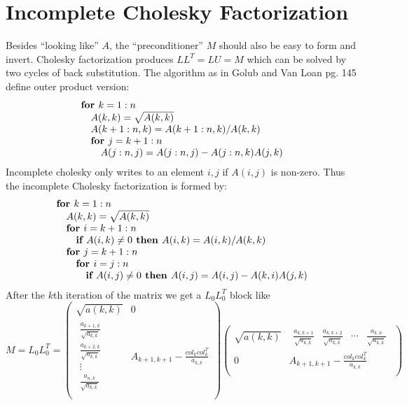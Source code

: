 \documentclass{article}
\newcommand{\pkeyword}[1]{\textbf{#1 }}
\newcommand{\pif}{\pkeyword{if}}
\newcommand{\pthen}{\pkeyword{ then}}
\newcommand{\pindent}{\textrm{\quad}}
\newcommand{\pfor}{\pkeyword{for}}
\begin{document}
\section{Incomplete Cholesky Factorization}
Besides ``looking like'' $A$, the ``preconditioner'' $M$ should also be easy to form and invert.  Cholesky factorization produces $LL^T=LU=M$ which
can be solved by two cycles of back substitution. The algorithm as in Golub and Van Loan pg. 145 define outer product version:
$$\begin{array}{ll}
\pfor k=1:n\\
\pindent A(k,k)=\sqrt{A(k,k)}\\
\pindent A(k+1:n,k)=A(k+1:n,k)/A(k,k)\\
\pindent\pfor j=k+1:n\\
\pindent\pindent A(j:n,j)=A(j:n,j)-A(j:n,k)A(j,k)\\
\end{array}$$
Incomplete cholesky only writes to an element $i,j$ if $A(i,j)$ is non-zero.  Thus the incomplete Cholesky factorization is formed by:
$$\begin{array}{ll}
\pfor k=1:n\\
\pindent A(k,k)=\sqrt{A(k,k)}\\
\pindent \pfor i=k+1:n \\
\pindent \pindent \pif A(i,k) \ne 0 \pthen A(i,k)=A(i,k)/A(k,k)\\
\pindent\pfor j=k+1:n\\
\pindent\pindent\pfor i=j:n\\
\pindent\pindent\pindent \pif A(i,j)\ne 0 \pthen
A(i,j)=A(i,j)-A(k,i) A(j,k)\\
\end{array}$$
After the $k$th iteration of the matrix we get a $L_0L_0^T$ block like
$$M=L_0L_0^T=\left(\begin{array}{c|c}
\sqrt{a(k,k)} & 0 \\
\hline \begin{array}{c} \frac{a_{k+1,k}}{\sqrt{a_{k,k}}} \\ \frac{a_{k+2,k}}{\sqrt{a_{k,k}}} \\
\vdots
\\ \frac{a_{n,k}}{\sqrt{a_{k,k}}}
\end{array} & A_{k+1,k+1}-\frac{col_k col_k^T}{a_{k,k}}
 \\
\end{array}\right)
\left(\begin{array}{c|c}
\sqrt{a(k,k)} & \begin{array}{cccc} \frac{a_{k,k+1}}{\sqrt{a_{k,k}}} &\frac{a_{k,k+2}}{\sqrt{a_{k,k}}} & \cdots &  \frac{a_{k,n}}{\sqrt{a_{k,k}}}\end{array} \\
\hline 0 & A_{k+1,k+1}-\frac{col_k col_k^T}{a_{k,k}}
 \\
\end{array}\right)$$
\end{document}
